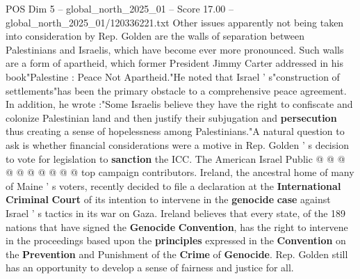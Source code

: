\begin{textsample}{POS Dim 5 – global\_north\_2025\_01 – Score 17.00 – global\_north\_2025\_01/120336221.txt}
Other issues apparently not being taken into consideration by Rep.
Golden are the walls of separation between Palestinians and Israelis, which have become ever more pronounced.
Such walls are a form of apartheid, which former President Jimmy Carter addressed in his book"Palestine : Peace Not Apartheid."He noted that Israel ' s"construction of settlements"has been the primary obstacle to a comprehensive peace agreement.
In addition, he wrote :"Some Israelis believe they have the right to confiscate and colonize Palestinian land and then justify their subjugation and \textbf{persecution} thus creating a sense of hopelessness among Palestinians."A natural question to ask is whether financial considerations were a motive in Rep.
Golden ' s decision to vote for legislation to \textbf{sanction} the ICC.
The American Israel Public @ @ @ @ @ @ @ @ @ @ top campaign contributors.
Ireland, the ancestral home of many of Maine ' s voters, recently decided to file a declaration at the \textbf{International} \textbf{Criminal} \textbf{Court} of its intention to intervene in the \textbf{genocide} \textbf{case} against Israel ' s tactics in its war on Gaza.
Ireland believes that every state, of the 189 nations that have signed the \textbf{Genocide} \textbf{Convention}, has the right to intervene in the proceedings based upon the \textbf{principles} expressed in the \textbf{Convention} on the \textbf{Prevention} and Punishment of the \textbf{Crime} of \textbf{Genocide}.
Rep.
Golden still has an opportunity to develop a sense of fairness and justice for all.

\end{textsample}
